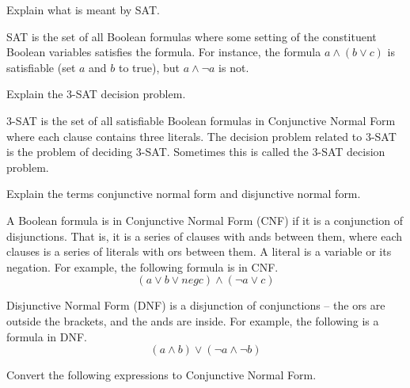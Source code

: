 \documentclass[addpoints,12pt]{exam}
\begin{document}
\begin{questions}
\question
  Explain what is meant by SAT.
  \begin{solution}
    SAT is the set of all Boolean formulas where some setting of the constituent Boolean variables satisfies the formula.
    For instance, the formula $a \land (b \lor c)$ is satisfiable (set $a$ and $b$ to true), but $a \land \neg a$ is not.
  \end{solution}

\question
  Explain the 3-SAT decision problem.
  \begin{solution}
   3-SAT is the set of all satisfiable Boolean formulas in Conjunctive Normal Form where each clause contains three literals.
   The decision problem related to 3-SAT is the problem of deciding 3-SAT.
   Sometimes this is called the 3-SAT decision problem.
  \end{solution}

\question
  Explain the terms conjunctive normal form and disjunctive normal form.
  \begin{solution}
    A Boolean formula is in Conjunctive Normal Form (CNF) if it is a conjunction of disjunctions.
    That is, it is a series of clauses with ands between them, where each clauses is a series of literals with ors between them.
    A literal is a variable or its negation.
    For example, the following formula is in CNF.
      $$ (a \lor b \lor neg c) \land (\neg a \lor c) $$
    
    Disjunctive Normal Form (DNF) is a disjunction of conjunctions -- the ors are outside the brackets, and the ands are inside.
    For example, the following is a formula in DNF.
      $$ (a \land b) \lor (\neg a \land \neg b) $$
  \end{solution}


\question
  Convert the following expressions to Conjunctive Normal Form.
\end{questions}
\end{document}
